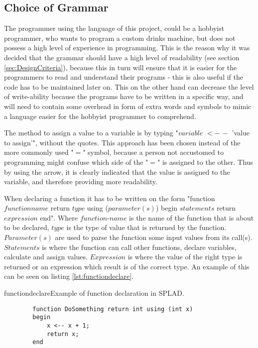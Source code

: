 \subsection{Choice of Grammar}
\label{sec:grammarchoice}
The programmer using the language of this project, could be a hobbyist programmer, who wants to program a custom drinks machine, but does not possess a high level of experience in programming. This is the reason why it was decided that the grammar should have a high level of readability (see section \ref{sec:DesignCriteria}), because this in turn will ensure that it is easier for the programmers to read and understand their programs - this is also useful if the code has to be maintained later on. This on the other hand can decrease the level of write-ability because the programs have to be written in a specific way, and will need to contain some overhead in form of extra words and symbols to mimic a language easier for the hobbyist programmer to comprehend.

The method to assign a value to a variable is by typing "$variable$ $<-\,-$ 'value to assign'", without the quotes. This approach has been chosen instead of the more commonly used "$=$" symbol, because a person not accustomed to programming might confuse which side of the "$=$" is assigned to the other. Thus by using the arrow, it is clearly indicated that the value is assigned to the variable, and therefore providing more readability.

When declaring a function it has to be written on the form "function $functionname$ return $type$ using ($parameter(s)$) begin $statements$ return $expression$ end". Where $function$-$name$ is the name of the function that is about to be declared, $type$ is the type of value that is returned by the function. $Parameter(s)$ are used to parse the function some input values from its call(s). $Statements$ is where the function can call other functions, declare variables, calculate and assign values. $Expression$ is where the value of the right type is returned or an expression which result is of the correct type.
An example of this can be seen on listing \ref{lst:functiondeclare}.

\begin{code}{functiondeclare}{Example of function declaration in SPLAD.}
	\begin{lstlisting}
		function DoSomething return int using (int x)
		begin
			x <-- x + 1;
			return x;
		end
	\end{lstlisting}
\end{code}

